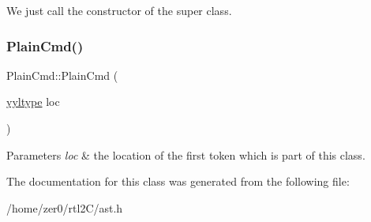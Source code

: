 We just call the constructor of the super class. \mbox{\label{class_plain_cmd_ad20a90f03ef6a1b71193df4d6ffef08d}} 
\subsubsection{\texorpdfstring{Plain\+Cmd()}{PlainCmd()}\hspace{0.1cm}{\footnotesize\ttfamily [2/2]}}
{\footnotesize\ttfamily Plain\+Cmd\+::\+Plain\+Cmd (\begin{DoxyParamCaption}\item[{\hyperlink{structyyltype}{yyltype}}]{loc }\end{DoxyParamCaption})\hspace{0.3cm}{\ttfamily [inline]}}


\begin{DoxyParams}{Parameters}
{\em loc} & the location of the first token which is part of this class. \\
\hline
\end{DoxyParams}


The documentation for this class was generated from the following file\+:\begin{DoxyCompactItemize}
\item 
/home/zer0/rtl2\+C/ast.\+h\end{DoxyCompactItemize}
